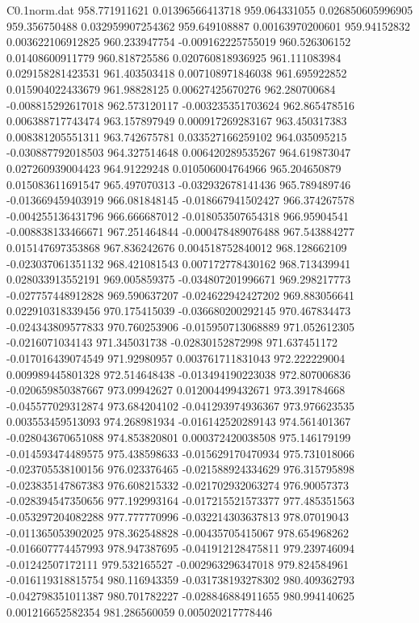 \begin{filecontents}{C0.1norm.dat}
958.771911621		0.01396566413718
959.064331055		0.026850605996905
959.356750488		0.032959907254362
959.649108887		0.00163970200601
959.94152832		0.003622106912825
960.233947754		-0.009162225755019
960.526306152		0.01408600911779
960.818725586		0.020760818936925
961.111083984		0.029158281423531
961.403503418		0.007108971846038
961.695922852		0.015904022433679
961.98828125		0.00627425670276
962.280700684		-0.008815292617018
962.573120117		-0.003235351703624
962.865478516		0.006388717743474
963.157897949		0.000917269283167
963.450317383		0.008381205551311
963.742675781		0.033527166259102
964.035095215		-0.030887792018503
964.327514648		0.006420289535267
964.619873047		0.027260939004423
964.91229248		0.010506004764966
965.204650879		0.015083611691547
965.497070313		-0.032932678141436
965.789489746		-0.013669459403919
966.081848145		-0.018667941502427
966.374267578		-0.004255136431796
966.666687012		-0.018053507654318
966.95904541		-0.008838133466671
967.251464844		-0.000478489076488
967.543884277		0.015147697353868
967.836242676		0.004518752840012
968.128662109		-0.023037061351132
968.421081543		0.007172778430162
968.713439941		0.028033913552191
969.005859375		-0.034807201996671
969.298217773		-0.027757448912828
969.590637207		-0.024622942427202
969.883056641		0.022910318339456
970.175415039		-0.036680200292145
970.467834473		-0.024343809577833
970.760253906		-0.015950713068889
971.052612305		-0.0216071034143
971.345031738		-0.02830152872998
971.637451172		-0.017016439074549
971.92980957		0.003761711831043
972.222229004		0.009989445801328
972.514648438		-0.013494190223038
972.807006836		-0.020659850387667
973.09942627		0.012004499432671
973.391784668		-0.045577029312874
973.684204102		-0.041293974936367
973.976623535		0.003553459513093
974.268981934		-0.016142520289143
974.561401367		-0.028043670651088
974.853820801		0.000372420038508
975.146179199		-0.014593474489575
975.438598633		-0.015629170470934
975.731018066		-0.023705538100156
976.023376465		-0.021588924334629
976.315795898		-0.023835147867383
976.608215332		-0.021702932063274
976.90057373		-0.028394547350656
977.192993164		-0.017215521573377
977.485351563		-0.053297204082288
977.777770996		-0.032214303637813
978.07019043		-0.011365053902025
978.362548828		-0.00435705415067
978.654968262		-0.016607774457993
978.947387695		-0.041912128475811
979.239746094		-0.01242507172111
979.532165527		-0.002963296347018
979.824584961		-0.016119318815754
980.116943359		-0.031738193278302
980.409362793		-0.042798351011387
980.701782227		-0.028846884911655
980.994140625		0.001216652582354
981.286560059		0.005020217778446

\end{filecontents}
